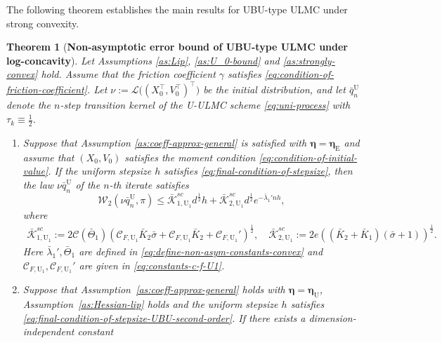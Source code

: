 \documentclass[12pt]{article}
\newenvironment{redtext}
  {\color{black}\ignorespaces}
  {\ignorespacesafterend}
\numberwithin{equation}{section}
\newtheorem{thm}{Theorem}[section]
\begin{document}
\begin{redtext}


The following theorem establishes the main results
for UBU-type ULMC under strong convexity.


\begin{thm}[\textbf{Non-asymptotic error bound of UBU-type ULMC under log-concavity}]
\label{thm:convex-main-result-UBU}
Let Assumptions \ref{as:Lip}, 
\ref{as:U_0-bound} and
\ref{as:strongly-convex} hold.
Assume that the friction coefficient \(\gamma\) satisfies
\eqref{eq:condition-of-friction-coefficient}.
Let
\(
\nu
:=
\mathcal L
\big(
(X_0^\top,V_0^\top)^\top
\big)
\)
be the initial distribution, and let
\(\bar q^{\mathrm U}_n\) denote the \(n\)-step transition
kernel of the U-ULMC scheme \eqref{eq:uni-process} with
\(\tau_k\equiv\frac12\).
\begin{enumerate}
\item Suppose that Assumption \ref{as:coeff-approx-general} is satisfied with $\boldsymbol{\eta}=\boldsymbol{\eta}_\mathrm{E}$ and assume that $(X_0, V_0)$ satisfies the moment condition \eqref{eq:condition-of-initial-value}. If the uniform stepsize $h$ satisfies \eqref{eq:final-condition-of-stepsize}, 
then the law
\(\nu\bar q^{\mathrm U}_n\) of the \(n\)-th iterate
satisfies
\begin{equation}
\label{eq:convex-main-result-UBU-gl}
\mathcal W_2
\left(
\nu\bar q^{\mathrm U}_n,
\pi
\right)
\leq
\bar{\mathcal K}_{1,\mathrm{U}_1}^{sc}
d^{\frac{1}{2}} h
+
\bar{\mathcal K}_{2,\mathrm{U}_1}^{sc}
d^{\frac{1}{2}}
e^{-\bar\lambda_1'nh},
\end{equation}
where
\begin{align*}
\bar{\mathcal K}_{1,\mathrm{U}_1}^{sc}
:={}
2
\mathcal C(\bar\Theta_1)
\left(
\mathcal C_{F,\mathrm{U}_1}\bar K_2\bar\sigma 
+
\mathcal C_{F,\mathrm{U}_1}\bar K_2
+
\mathcal C_{F,\mathrm{U}_1}'
\right)^{\frac12},
\quad
\bar{\mathcal K}_{2,\mathrm{U}_1}^{sc}
:=
2e
\left(
(\bar K_2+\bar K_1)
(\bar\sigma +1)
\right)^{\frac12}.
\end{align*}
Here \(\bar\lambda_1', \bar\Theta_1\) are defined in
\eqref{eq:define-non-asym-constants-convex} and 
\(\mathcal C_{F,\mathrm{U}_1}, \mathcal C_{F,\mathrm{U}_1}'\) are given in \eqref{eq:constants-c-f-U1}.
\item 
Suppose that
Assumption~\ref{as:coeff-approx-general} holds with
$\boldsymbol{\eta}=\boldsymbol{\eta}_{\mathrm U}$, Assumption~\ref{as:Hessian-lip} holds and the uniform stepsize $h$ satisfies \eqref{eq:final-condition-of-stepsize-UBU-second-order}. If there exists a dimension-independent constant

\end{enumerate}
\end{thm}
\end{redtext}
\end{document}
